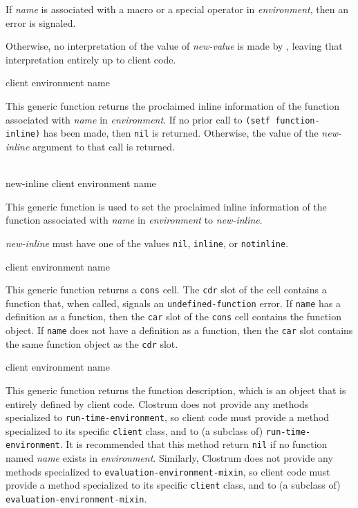 If \textit{name} is associated with a macro or a special
operator in \textit{environment}, then an error is signaled.

Otherwise, no interpretation of the value of \textit{new-value} is
made by \sysname{}, leaving that interpretation entirely up to client
code.

 {client environment name}

This generic function returns the proclaimed inline information of the
function associated with \textit{name} in \textit{environment}.  If no
prior call to \texttt{(setf function-inline)} has been made, then
\texttt{nil} is returned.  Otherwise, the value of the
\textit{new-inline} argument to that call is returned.

\\
{new-inline client environment name}

This generic function is used to set the proclaimed inline information
of the function associated with \textit{name} in
\textit{environment} to \textit{new-inline}.

\textit{new-inline} must have one of the values \texttt{nil},
\texttt{inline}, or \texttt{notinline}.

 {client environment name}

This generic function returns a \texttt{cons} cell.  The \texttt{cdr}
slot of the cell contains a function that, when called, signals an
\texttt{undefined-function} error.  If \texttt{name} has a
definition as a function, then the \texttt{car} slot of the \texttt{cons}
cell contains the function object.  If \texttt{name} does not
have a definition as a function, then the \texttt{car} slot contains
the same function object as the \texttt{cdr} slot.

 {client environment name}

This generic function returns the function description, which is an
object that is entirely defined by client code.  Clostrum does not
provide any methods specialized to \texttt{run-time-environment}, so
client code must provide a method specialized to its specific
\texttt{client} class, and to (a subclass of)
\texttt{run-time-environment}.  It is recommended that this method
return \texttt{nil} if no function named \textit{name} exists
in \textit{environment}.  Similarly, Clostrum does not provide any
methods specialized to \texttt{evaluation-environment-mixin}, so
client code must provide a method specialized to its specific
\texttt{client} class, and to (a subclass of)
\texttt{evaluation-environment-mixin}.

